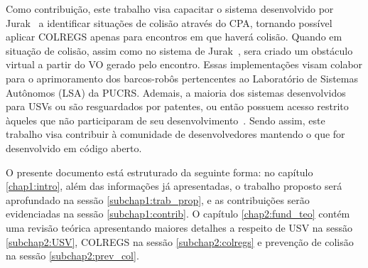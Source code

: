     Como contribuição, este trabalho visa capacitar o sistema desenvolvido por Jurak~\cite{JURAK2020} a identificar situações de colisão através do CPA, tornando possível aplicar COLREGS apenas para encontros em que haverá colisão. Quando em situação de colisão, assim como no sistema de Jurak~\cite{JURAK2020}, sera criado um obstáculo virtual a partir do VO gerado pelo encontro. Essas implementações visam colabor para o aprimoramento dos barcos-robôs pertencentes ao Laboratório de Sistemas Autônomos (LSA) da PUCRS. Ademais, a maioria dos sistemas desenvolvidos para USVs ou são resguardados por patentes, ou então possuem acesso restrito àqueles que não participaram de seu desenvolvimento~\cite{JURAK2020}. Sendo assim, este trabalho visa contribuir à comunidade de desenvolvedores mantendo o que for desenvolvido em código aberto. 
    
    O presente documento está estruturado da seguinte forma: no capítulo \ref{chap1:intro}, além das informações já apresentadas, o trabalho proposto será aprofundado na sessão \ref{subchap1:trab_prop}, e as contribuições serão evidenciadas na sessão \ref{subchap1:contrib}. O capítulo \ref{chap2:fund_teo} contém uma revisão teórica apresentando maiores detalhes a respeito de USV na sessão \ref{subchap2:USV}, COLREGS na sessão \ref{subchap2:colregs} e prevenção de colisão na sessão \ref{subchap2:prev_col}.
    
